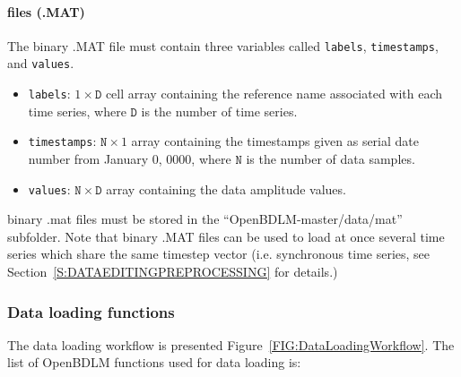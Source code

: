 \paragraph{\MATLAB{} files (.MAT)}
\label{SS:MATInput}

The \MATLAB{} binary .MAT file must contain three \MATLAB{} variables called \lstinline[basicstyle = \mlttfamily \small]!labels!, \lstinline[basicstyle = \mlttfamily \small]!timestamps!, and \lstinline[basicstyle = \mlttfamily \small]!values!.
\begin{itemize}
\item \lstinline[basicstyle = \mlttfamily \small]!labels!: $1\times \mathtt{D}$ cell array containing the reference name associated with each time series, where $\mathtt{D}$ is the number of time series.
\item \lstinline[basicstyle = \mlttfamily \small]!timestamps!: $\mathtt{N}\times 1$ array containing the timestamps given as serial date number from January 0, 0000, where $\mathtt{N}$ is the number of data samples.
\item \lstinline[basicstyle = \mlttfamily \small]!values!: $\mathtt{N}\times \mathtt{D}$ array containing the data amplitude values.
\end{itemize}
 \MATLAB{} binary .mat files must be stored in the ``OpenBDLM-master/data/mat'' subfolder.
Note that \MATLAB{} binary .MAT files can be used to load at once several time series which share the same timestep vector (i.e. synchronous time series, see Section~\ref{S:DATAEDITINGPREPROCESSING}  for details.)


\subsubsection{Data loading functions}

The data loading workflow is presented Figure~\ref{FIG:DataLoadingWorkflow}. The list of OpenBDLM functions used for data loading is:


